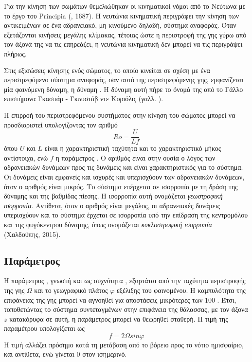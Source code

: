 Για την κίνηση των σωμάτων θεμελιώθηκαν οι κινηματικοί νόμοι από το Νεύτωνα με το έργο του \textlatin{Principia} (, 1687). Η νευτώνια κινηματική περιγράφει την κίνηση των αντικειμένων σε ένα αδρανειακό, μη κινούμενο δηλαδή, σύστημα αναφοράς. Όταν εξετάζονται κινήσεις μεγάλης κλίμακας, τέτοιας ώστε η περιστροφή της γης γύρω από τον άξονά της να τις επηρεάζει, η νευτώνια κινηματική δεν μπορεί να τις περιγράψει πλήρως.

Στις εξισώσεις κίνησης ενός σώματος, το οποίο κινείται σε σχέση με ένα περιστρεφόμενο σύστημα αναφοράς, σαν αυτό της περιστρεφόμενης γης, εμφανίζεται μία φαινόμενη δύναμη, η δύναμη \cor. Η δύναμη αυτή πήρε το όνομά της από το Γάλλο επιστήμονα  Γκασπάρ - Γκoυστάβ ντε Κοριόλις (γαλλ. ).

Η επιρροή του περιστρεφόμενου συστήματος στην κίνηση του σώματος μπορεί να προσδιοριστεί υπολογίζοντας τον αριθμό \textit{\ros}
\begin{equation}
	Ro = \frac{U}{{Lf}}
\end{equation}
όπου $U$ και $L$ είναι η χαρακτηριστική ταχύτητα και το χαρακτηριστικό μήκος αντίστοιχα, ενώ $f$ η παράμετρος \cor . Ο αριθμός \cor  είναι στην ουσία ο λόγος των αδρανειακών δυνάμεων προς τις δυνάμεις \cor  και είναι χαρακτηριστικός για το σύστημα. Οι δυνάμεις \cor  είναι εμφανείς και ισχυρές και υπερισχύουν των αδρανειακών δυνάμεων, όταν ο αριθμός \ros είναι μικρός. Το σύστημα επέρχεται σε ισορροπία με τη δράση της δύναμης \cor  και της βαθμίδας πίεσης. Η ισορροπία αυτή ονομάζεται \textit{γεωστροφική ισορροπία}. Αντίθετα, όταν ο αριθμός \ros είναι μεγάλος, οι αδρανειακές δυνάμεις υπερισχύουν και το σύστημα έρχεται σε ισορροπία υπό την επίδραση της κεντρομόλου και της φυγόκεντρου δύναμης, όπως ονομάζεται \textit{κυκλοστροφική ισορροπία} (Χαλδούπης, 2015).

\subsection{Παράμετρος \cor {}}	
Η παράμετρος \cor, γνωστή και ως συχνότητα \cor, εξαρτάται από την ταχύτητα περιστροφής της γης $Ω$ και το γεωγραφικό πλάτος $φ$ εξέλιξης του φαινομένου. Η καμπυλότητα της επιφάνειας της γης μπορεί να αγνοηθεί για αποστάσεις μικρότερες των 100 . Έτσι, τοποθετώντας το σύστημα συντεταγμένων στην επιφάνεια της θάλασσας, με τον άξονα $z$ κατακόρυφα σε αυτή, η παράμετρος \cor {} μπορεί να θεωρηθεί σταθερή. Η τιμή της παραμέτρου υπολογίζεται ως
\begin{equation}
	f=2Ωsinφ
\end{equation}
Η τιμή αλλάζει πρόσημο κατά τη μετάβαση από το βόρειο προς το νότιο ημισφαίριο, και αντίθετα, ενώ γίνεται 0 στον ισημερινό.

